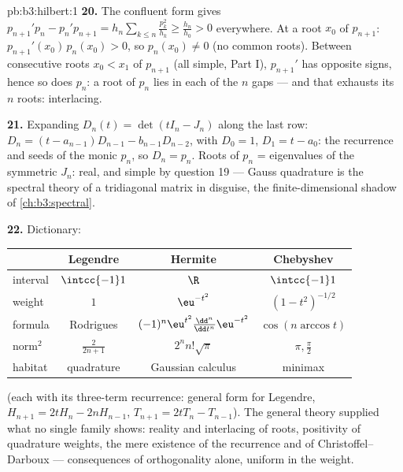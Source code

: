\begin{solution}{pb:b3:hilbert:1}
\textbf{20.} The confluent form gives $p_{n+1}'p_n -
p_n'p_{n+1} = h_n\sum_{k\leq n}\frac{p_k^2}{h_k} \geq
\frac{h_n}{h_0} > 0$ everywhere. At a root $x_0$ of
$p_{n+1}$: $p_{n+1}'(x_0)\,p_n(x_0) > 0$, so $p_n(x_0) \neq
0$ (no common roots). Between consecutive roots $x_0 < x_1$
of $p_{n+1}$ (all simple, Part I), $p_{n+1}'$ has opposite
signs, hence so does $p_n$: a root of $p_n$ lies in each of
the $n$ gaps --- and that exhausts its $n$ roots:
interlacing.

\textbf{21.} Expanding $D_n(t) = \det(tI_n - J_n)$ along the
last row: $D_n = (t - a_{n-1})D_{n-1} - b_{n-1}D_{n-2}$,
with $D_0 = 1$, $D_1 = t - a_0$: the recurrence and seeds of
the monic $p_n$, so $D_n = p_n$. Roots of $p_n$ =
eigenvalues of the symmetric $J_n$: real, and simple by
question 19 --- Gauss quadrature is the spectral theory of a
tridiagonal matrix in disguise, the finite-dimensional
shadow of \cref{ch:b3:spectral}.

\textbf{22.} Dictionary:
\begin{center}
\begin{tabular}{l|c|c|c}
 & Legendre & Hermite & Chebyshev\\
\hline
interval & $\intcc{-1}1$ & $\R$ & $\intcc{-1}1$\\
weight & $1$ & $\eu^{-t^2}$ & $(1-t^2)^{-1/2}$\\
formula & Rodrigues & $(-1)^n\eu^{t^2}
\frac{\dd^n}{\dd t^n}\eu^{-t^2}$ & $\cos(n\arccos t)$\\
norm$^2$ & $\frac2{2n+1}$ & $2^nn!\sqrt\pi$ & $\pi,
\frac\pi2$\\
habitat & quadrature & Gaussian calculus & minimax\\
\end{tabular}
\end{center}
(each with its three-term recurrence: general form for
Legendre, $H_{n+1} = 2tH_n - 2nH_{n-1}$, $T_{n+1} = 2tT_n -
T_{n-1}$). The general theory supplied what no single family
shows: reality and interlacing of roots, positivity of
quadrature weights, the mere existence of the recurrence and
of Christoffel--Darboux --- consequences of orthogonality
alone, uniform in the weight.


\end{solution}
